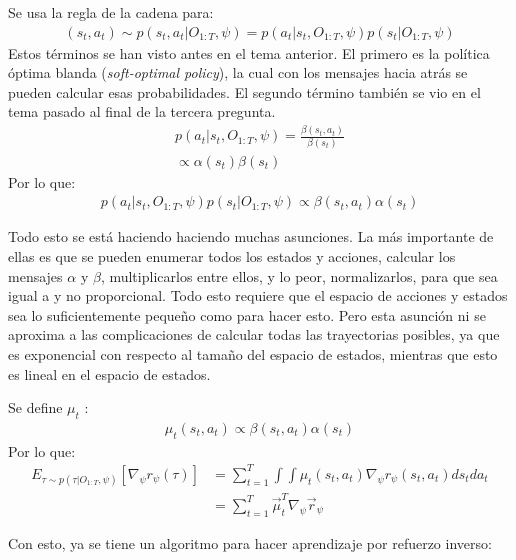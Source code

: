 Se usa la regla de la cadena para:
\begin{align}
( s _ { t } , a _ { t } ) \sim p ( s _ { t } , a _ { t } | O _ { 1 : T } , \psi )=
p ( a _ { t } | s _ { t } , O _ { 1 : T } , \psi ) p ( s _ { t } | O _ { 1 : T } , \psi )
\end{align}
Estos términos se han visto antes en el tema anterior. El primero es la política óptima
blanda (\textit{soft-optimal policy}), la cual con los mensajes hacia atrás se pueden calcular
esas probabilidades. El segundo término también se vio en el tema pasado al final de la tercera
pregunta.
\begin{align}
    p(a_t|s_t,O_{1:T},\psi)= \frac{\beta(s_t,a_t)}{\beta(s_t)} \\
    \propto \alpha(s_t)\beta(s_t)
\end{align}
Por lo que:
\begin{align}
p ( a _ { t } | s _ { t } , O _ { 1 : T } , \psi ) p ( s _ { t } | O _ { 1 : T } , \psi ) \propto \beta ( s _ { t } , a _ { t } ) \alpha ( s _ { t } )
\end{align}

Todo esto se está haciendo haciendo muchas asunciones. La más importante de ellas es que se
pueden enumerar todos los estados y acciones, calcular los mensajes $\alpha$ y $\beta$,
multiplicarlos entre ellos, y lo peor, normalizarlos, para que sea igual a y no proporcional.
Todo esto requiere que el espacio de acciones y estados sea lo suficientemente
pequeño como para hacer esto. Pero esta asunción ni se aproxima a las complicaciones de
calcular todas las trayectorias posibles, ya que es exponencial con respecto al tamaño del
espacio de estados, mientras que esto es lineal en el espacio de estados.

Se define $\mu_t$ :
\begin{align}
\mu _ { t } ( s _ { t } , a _ { t } ) \propto \beta ( s _ { t } , a _ { t } ) \alpha ( s _ { t } )
\end{align}
Por lo que:
\begin{align}
E _ { \tau \sim p ( \tau | O _ { 1 : T } , \psi ) } [ \nabla _ { \psi } r _ { \psi } ( \tau ) ]
&=
\sum _ { t = 1 } ^ { T } \int \int \mu _ { t } ( s _ { t } , a _ { t } ) \nabla _ { \psi } r _ {
\psi } ( s _ { t } , a _ { t } ) d s _ { t } d a _ { t }\\
&=\sum_{t=1}^T \overrightarrow{\mu}_t^T \nabla_\psi \overrightarrow{r}_\psi
\end{align}

Con esto, ya se tiene un algoritmo para hacer aprendizaje por refuerzo inverso:

